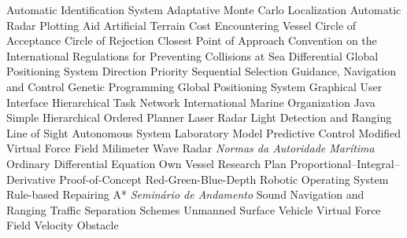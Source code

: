 \begin{acronym}
      {Automatic Identification System}
     {Adaptative Monte Carlo Localization}
     {Automatic Radar Plotting Aid}
      {Artificial Terrain Cost}
       {Encountering Vessel}
      {Circle of Acceptance}
      {Circle of Rejection}
      {Closest Point of Approach}
  {Convention on the International Regulations for Preventing Collisions at Sea}
     {Differential Global Positioning System}
     {Direction Priority Sequential Selection}
      {Guidance, Navigation and Control}
       {Genetic Programming}
      {Global Positioning System}
      {Graphical User Interface}
      {Hierarchical Task Network}
      {International Marine Organization}
    {Java Simple Hierarchical Ordered Planner}
    {Laser Radar}
    {Light Detection and Ranging}
      {Line of Sight}
      {Autonomous System Laboratory}
      {Model Predictive Control}
     {Modified Virtual Force Field}
      {Milimeter Wave Radar}
   {\textit{Normas da Autoridade Marítima}}
      {Ordinary Differential Equation}
       {Own Vessel}
      {Research Plan}
      {Proportional–Integral–Derivative}
      {Proof-of-Concept}
     {Red-Green-Blue-Depth}
      {Robotic Operating System}
    {Rule-based Repairing A*}
       {\textit{Seminário de Andamento}}
    {Sound Navigation and Ranging}
      {Traffic Separation Schemes}
      {Unmanned Surface Vehicle}
      {Virtual Force Field}
       {Velocity Obstacle}
\end{acronym}
